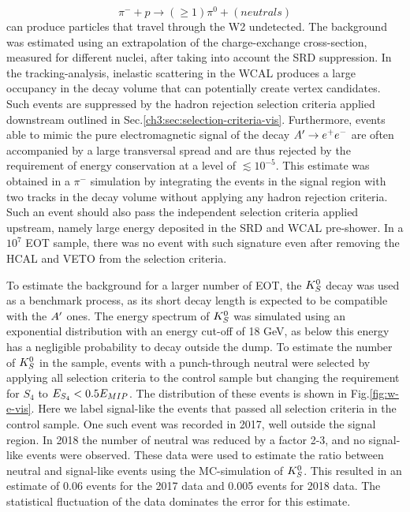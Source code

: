 \begin{equation}
  \label{eq:vis-int-neutral}
  \pi^- + p \rightarrow (\geq 1)\pi^0 + (neutrals)
\end{equation}
can produce particles that travel through the W2 undetected. The background was estimated using an extrapolation of the charge-exchange cross-section, measured for different nuclei, after taking into account the SRD suppression. In the tracking-analysis, inelastic scattering in the WCAL produces a large occupancy in the decay volume that can potentially create vertex candidates. Such events are suppressed by the hadron rejection selection criteria applied downstream outlined in Sec.\ref{ch3:sec:selection-criteria-vis}. Furthermore, events able to mimic the pure electromagnetic signal of the decay $A' \rightarrow e^+ e^-$ are often accompanied by a large transversal spread and are thus rejected by the requirement of energy conservation at a level of $\lesssim 10^{-5}$. This estimate was obtained in a $\pi^-$ simulation by integrating the events in the signal region with two tracks in the decay volume without applying any hadron rejection criteria. Such an event should also pass the independent selection criteria applied upstream, namely large energy deposited in the SRD and WCAL pre-shower. In a $10^7$ EOT sample, there was no event with such signature even after removing the HCAL and VETO from the selection criteria.

To estimate the background for a larger number of EOT, the $K^0_S$ decay was used as a benchmark process, as its short decay length is expected to be compatible with the $A'$ ones. The energy spectrum of $K^0_S$ was simulated using an exponential distribution with an energy cut-off of 18 GeV, as below this energy has a negligible probability to decay outside the dump. To estimate the number of $K^0_S$ in the sample, events with a punch-through neutral were selected by applying all selection criteria to the control sample but changing the requirement for $S_4$ to $E_{S_4} < 0.5 E_{MIP}$. The distribution of these events is shown in Fig.\ref{fig:w-e-vis}. Here we label signal-like the events that passed all selection criteria in the control sample. One such event was recorded in 2017, well outside the signal region. In 2018 the number of neutral was reduced by a factor 2-3, and no signal-like events were observed. These data were used to estimate the ratio between neutral and signal-like events using the MC-simulation of $K^0_S$. This resulted in an estimate of 0.06 events for the 2017 data and 0.005 events for 2018 data. The statistical fluctuation of the data dominates the error for this estimate.

